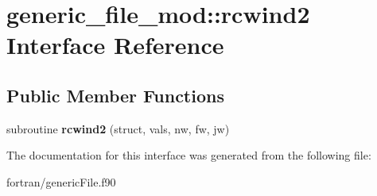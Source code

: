 \hypertarget{interfacegeneric__file__mod_1_1rcwind2}{}\section{generic\+\_\+file\+\_\+mod\+:\+:rcwind2 Interface Reference}
\label{interfacegeneric__file__mod_1_1rcwind2}
\subsection*{Public Member Functions}
\begin{DoxyCompactItemize}
\item 
\mbox{\label{interfacegeneric__file__mod_1_1rcwind2_a2b9521f28fa5121d88137d6855419e0c}} 
subroutine {\bfseries rcwind2} (struct, vals, nw, fw, jw)
\end{DoxyCompactItemize}


The documentation for this interface was generated from the following file\+:\begin{DoxyCompactItemize}
\item 
fortran/generic\+File.\+f90\end{DoxyCompactItemize}
